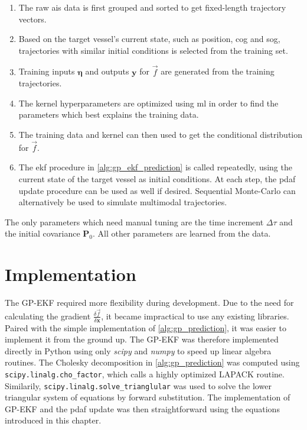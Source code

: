\begin{enumerate}
    \item The raw \acrshort{ais} data is first grouped and sorted to get fixed-length trajectory vectors.
    \item Based on the target vessel's current state, such as position, \acrshort{cog} and \acrshort{sog}, trajectories with similar initial conditions is selected from the training set.
    \item Training inputs $\boldsymbol{\eta}$ and outputs $\boldsymbol{y}$ for $\vec{f}$ are generated from the training trajectories.
    \item The kernel hyperparameters are optimized using \acrshort{ml} in order to find the parameters which best explains the training data.
    \item The training data and kernel can then used to get the conditional distribution for $\vec{f}$.
    \item The \acrshort{ekf} procedure in \cref{alg:gp_ekf_prediction} is called repeatedly, using the current state of the target vessel as initial conditions. At each step, the \acrshort{pdaf} update procedure can be used as well if desired. Sequential Monte-Carlo can alternatively be used to simulate multimodal trajectories.
\end{enumerate}

The only parameters which need manual tuning are the time increment $\Delta \tau$ and the initial covariance $\boldsymbol{P}_0$. All other parameters are learned from the data.


\section{Implementation}
The GP-EKF required more flexibility during development. Due to the need for calculating the gradient $\frac{\delta \vec{f}}{\delta \boldsymbol{x}}$, it became impractical to use any existing libraries. Paired with the simple implementation of \cref{alg:gp_prediction}, it was easier to implement it from the ground up.
The GP-EKF was therefore implemented directly in Python using only \textit{scipy}\cite{scipy} and \textit{numpy}\cite{numpy} to speed up linear algebra routines. The Cholesky decomposition in \cref{alg:gp_prediction} was computed using \texttt{scipy.linalg.cho\_factor}, which calls a highly optimized LAPACK routine. Similarily, \texttt{scipy.linalg.solve\_\-trianglular} was used to solve the lower triangular system of equations by forward substitution. The implementation of GP-EKF and the \acrshort{pdaf} update was then straightforward using the equations introduced in this chapter. 



